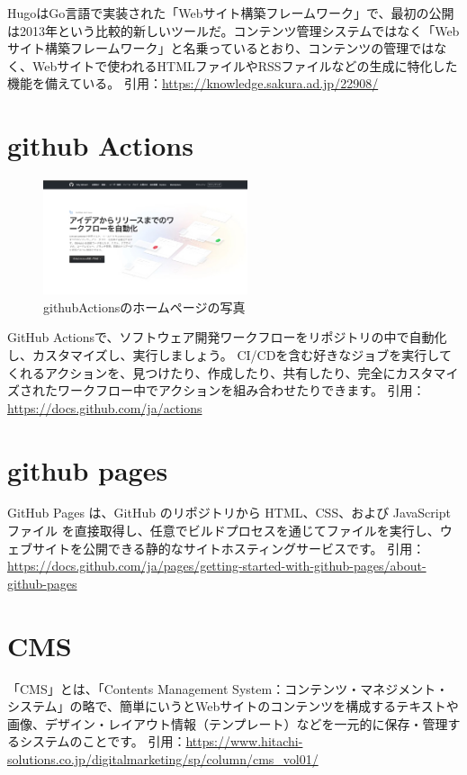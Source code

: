   \begin{tcolorbox}[title=hugoとは]
    HugoはGo言語で実装された「Webサイト構築フレームワーク」で、最初の公開は2013年という比較的新しいツールだ。コンテンツ管理システムではなく「Webサイト構築フレームワーク」と名乗っているとおり、コンテンツの管理ではなく、Webサイトで使われるHTMLファイルやRSSファイルなどの生成に特化した機能を備えている。
    引用：\url{https://knowledge.sakura.ad.jp/22908/}
  \end{tcolorbox}

\section{github Actions}

  \begin{figure}[H]
    \centering
    \includegraphics[width=6cm]{./image/02-chap3/githubActions.png}
    \caption{githubActionsのホームページの写真}
    \label{chap3-githubAction-image}
  \end{figure}

  \begin{tcolorbox}[title=github pagesとは]
    GitHub Actionsで、ソフトウェア開発ワークフローをリポジトリの中で自動化し、カスタマイズし、実行しましょう。 CI/CDを含む好きなジョブを実行してくれるアクションを、見つけたり、作成したり、共有したり、完全にカスタマイズされたワークフロー中でアクションを組み合わせたりできます。
    引用：\url{https://docs.github.com/ja/actions}
  \end{tcolorbox}

\section{github pages}

  \begin{tcolorbox}[title=hugoとは]
    GitHub Pages は、GitHub のリポジトリから HTML、CSS、および JavaScript ファイル を直接取得し、任意でビルドプロセスを通じてファイルを実行し、ウェブサイトを公開できる静的なサイトホスティングサービスです。
    引用：\url{https://docs.github.com/ja/pages/getting-started-with-github-pages/about-github-pages}
  \end{tcolorbox}


\section{CMS}

  \begin{tcolorbox}[title=hugoとは]
    「CMS」とは、「Contents Management System：コンテンツ・マネジメント・システム」の略で、簡単にいうとWebサイトのコンテンツを構成するテキストや画像、デザイン・レイアウト情報（テンプレート）などを一元的に保存・管理するシステムのことです。
    引用：\url{https://www.hitachi-solutions.co.jp/digitalmarketing/sp/column/cms_vol01/} 
  \end{tcolorbox}

